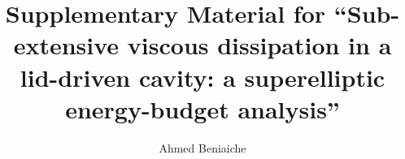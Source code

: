 \documentclass[aip,pof,preprint]{revtex4-2}
\begin{document}
\title{Supplementary Material for ``Sub-extensive viscous dissipation in a lid-driven cavity: a superelliptic energy-budget analysis''}

\author{Ahmed Beniaiche}

\maketitle

\tableofcontents













\end{document}
